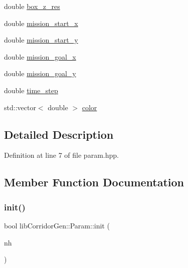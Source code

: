 \begin{DoxyCompactItemize}
double \hyperlink{classlib_corridor_gen_1_1_param_a57326306f4c8312d30e3cf3345dbf6b3}{box\+\_\+z\+\_\+res}
\item 
double \hyperlink{classlib_corridor_gen_1_1_param_ac6dc24f51f8f0a382ad1d57f799dbfd1}{mission\+\_\+start\+\_\+x}
\item 
double \hyperlink{classlib_corridor_gen_1_1_param_a302faea25f3c79852939fac4231c7659}{mission\+\_\+start\+\_\+y}
\item 
double \hyperlink{classlib_corridor_gen_1_1_param_a4697fad18a536c8b1b1367d3497640d0}{mission\+\_\+goal\+\_\+x}
\item 
double \hyperlink{classlib_corridor_gen_1_1_param_a4691919af4489f2cf4047a4d569b644f}{mission\+\_\+goal\+\_\+y}
\item 
double \hyperlink{classlib_corridor_gen_1_1_param_a4cad71446f0b95b7ab94d9a3a484821c}{time\+\_\+step}
\item 
std\+::vector$<$ double $>$ \hyperlink{classlib_corridor_gen_1_1_param_a5619419eba931d2e33d49a52699a08d8}{color}
\end{DoxyCompactItemize}


\subsection{Detailed Description}


Definition at line 7 of file param.\+hpp.



\subsection{Member Function Documentation}
\mbox{\label{classlib_corridor_gen_1_1_param_aafe3d5fb62dfc1c9f8fb700d7a1c9c8c}} 
\subsubsection{\texorpdfstring{init()}{init()}}
{\footnotesize\ttfamily bool lib\+Corridor\+Gen\+::\+Param\+::init (\begin{DoxyParamCaption}\item[{const ros\+::\+Node\+Handle \&}]{nh }\end{DoxyParamCaption})}



